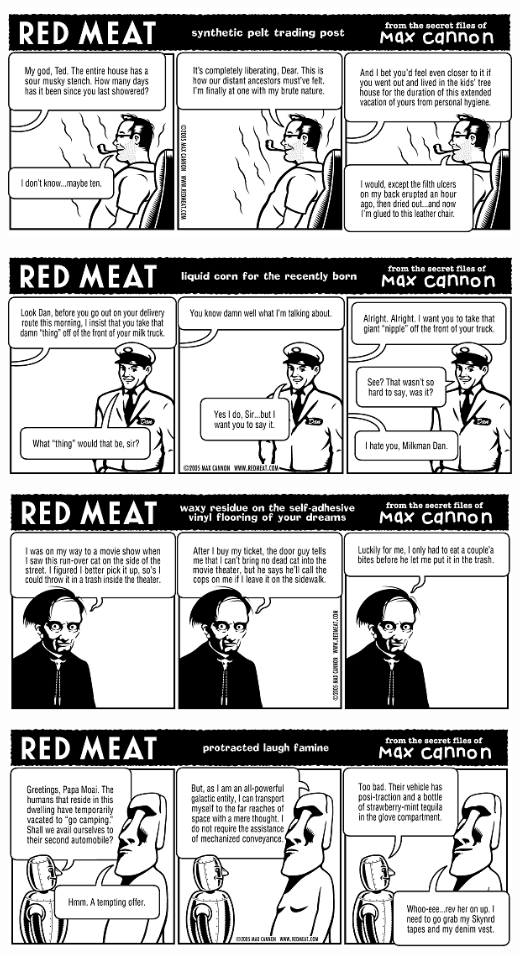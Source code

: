 \documentclass[a4paper,twoside,11pt]{article}
\begin{document}
\includegraphics[width=\textwidth]{redmeat_2005-07-05.png}



\includegraphics[width=\textwidth]{redmeat_2005-07-12.png}



\includegraphics[width=\textwidth]{redmeat_2005-07-19.png}



\includegraphics[width=\textwidth]{redmeat_2005-07-26.png}
\end{document}
